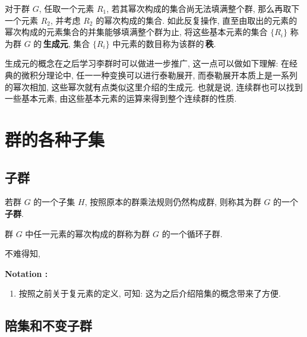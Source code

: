             \begin{Definition}[有限群的生成元与秩]
                对于群 $G$, 任取一个元素 $R_1$, 若其幂次构成的集合尚无法填满整个群, 那么再取下一个元素 $R_2$, 并考虑 $R_2$ 的幂次构成的集合. 如此反复操作, 直至由取出的元素的幂次构成的元素集合的并集能够填满整个群为止, 将这些基本元素的集合 $\{R_i\}$ 称为群 $G$ 的\,\textbf{生成元}, 集合 $\{R_i\}$ 中元素的数目称为该群的\,\textbf{秩}.
            \end{Definition}

        \hspace*{2em}生成元的概念在之后学习李群时可以做进一步推广, 这一点可以做如下理解: 在经典的微积分理论中, 任一一种变换可以进行泰勒展开, 而泰勒展开本质上是一系列的幂次相加, 这些幂次就有点类似这里介绍的生成元. 也就是说, 连续群也可以找到一些基本元素, 由这些基本元素的运算来得到整个连续群的性质.

\section{群的各种子集}
    \subsection{子群}
        \begin{Definition}[子群]
            若群 $G$ 的一个子集 $H$, 按照原本的群乘法规则仍然构成群, 则称其为群 $G$ 的一个\,\textbf{子群}.
        \end{Definition}

        \begin{Definition}[循环子群]
            群 $G$ 中任一元素的幂次构成的群称为群 $G$ 的一个循环子群.
        \end{Definition}

        不难得知, 

        \textbf{Notation :}
        \begin{enumerate}
            \item 按照之前关于复元素的定义, 可知:  这为之后介绍陪集的概念带来了方便.
        \end{enumerate}

    \subsection{陪集和不变子群}


